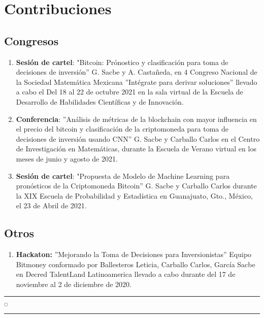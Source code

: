 \chapter*{Contribuciones}
%
%	
%

\section*{Congresos}


\begin{enumerate}

	\item \textbf{Sesión de cartel}: "Bitcoin: Prónostico y clasificación para toma de decisiones de inversión'' G. Sacbe y A. Castañeda, en 4 Congreso Nacional de la Sociedad Matemática Mexicana ''Intégrate para derivar soluciones'' llevado a cabo el Del 18 al 22 de octubre 2021 en la sala virtual de la Escuela de Desarrollo de Habilidades Científicas y de Innovación.
	\item \textbf{Conferencia}: ''Análisis de métricas de la blockchain con mayor influencia en el precio del bitcoin y clasificación de la criptomoneda para toma de decisiones de inversión usando CNN'' G. Sacbe y Carballo Carlos en el Centro de Investigación en Matemáticas, durante la Escuela de Verano virtual en los meses de junio y agosto de 2021.
	\item \textbf{Sesión de cartel}: "Propuesta de Modelo de Machine Learning para pronósticos de la Criptomoneda Bitcoin'' G. Sacbe y Carballo Carlos durante la XIX Escuela de Probabilidad y Estadística en Guanajuato, Gto., México, el 23 de Abril de 2021.

\end{enumerate}

\section*{Otros}

\begin{enumerate}
	\item \textbf{Hackaton:} ''Mejorando la Toma de Decisiones para Inversionistas'' Equipo Bitmoney conformado por Ballesteros Leticia, Carballo Carlos, García Sacbe en Decred TalentLand Latinoamerica llevado a cabo durante del 17 de noviembre al 2 de diciembre de 2020.
\end{enumerate}



\noindent
\rule{0.49\textwidth}{0.75pt} $_{\bigcirc}$ \rule{0.49\textwidth}{0.75pt}\\







